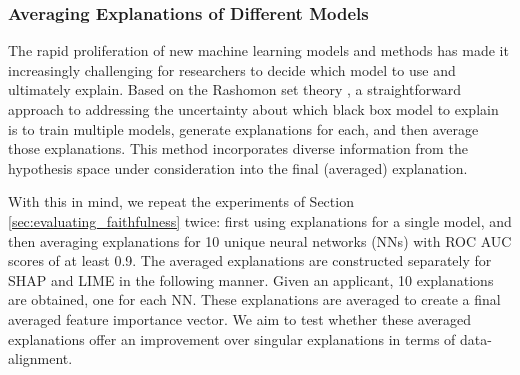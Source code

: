 \documentclass[12pt]{article}  %
\begin{document}
            
       

        \subsubsection{Averaging Explanations of Different Models}
           The rapid proliferation of new machine learning models and methods has made it increasingly challenging for researchers to decide which model to use and ultimately explain. Based on the Rashomon set theory \citep{semenova22rashomon,wang2022timbertrek,donnelly2023rashomon}, a straightforward approach to addressing the uncertainty about which black box model to explain is to train multiple models, generate explanations for each, and then average those explanations. This method incorporates diverse information from the hypothesis space under consideration into the final (averaged) explanation.


            With this in mind, we repeat the experiments of Section \ref{sec:evaluating_faithfulness} twice: first using explanations for a single model, and then averaging explanations for 10 unique neural networks (NNs) with ROC AUC scores of at least 0.9. The averaged explanations are constructed separately for SHAP and LIME in the following manner. Given an applicant, 10 explanations are obtained, one for each NN. These explanations are averaged to create a final averaged feature importance vector. We aim to test whether these averaged explanations offer an improvement over singular explanations in terms of data-alignment.
             
\end{document}
